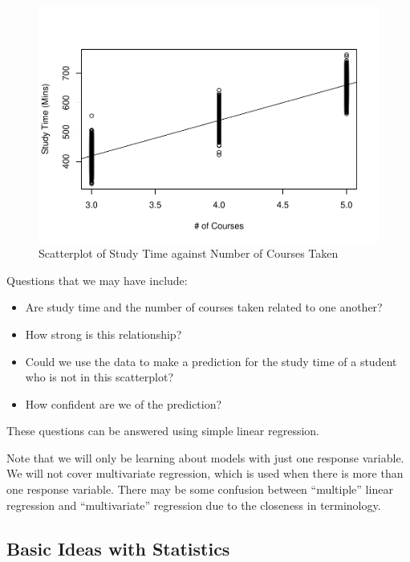 \documentclass[
]{book}
\providecommand{\tightlist}{%
  \setlength{\itemsep}{0pt}\setlength{\parskip}{0pt}}
\begin{document}
\begin{figure}
\centering
\includegraphics{bookdown-demo_files/figure-latex/scatter-courses-1.pdf}
\caption{\label{fig:scatter-courses}Scatterplot of Study Time against Number of Courses Taken}
\end{figure}

Questions that we may have include:

\begin{itemize}
\tightlist
\item
  Are study time and the number of courses taken related to one another?
\item
  How strong is this relationship?
\item
  Could we use the data to make a prediction for the study time of a student who is not in this scatterplot?
\item
  How confident are we of the prediction?
\end{itemize}

These questions can be answered using simple linear regression.

Note that we will only be learning about models with just one response variable. We will not cover multivariate regression, which is used when there is more than one response variable. There may be some confusion between ``multiple'' linear regression and ``multivariate'' regression due to the closeness in terminology.

\subsection{Basic Ideas with Statistics}\label{basic-ideas-with-statistics}
\end{document}
